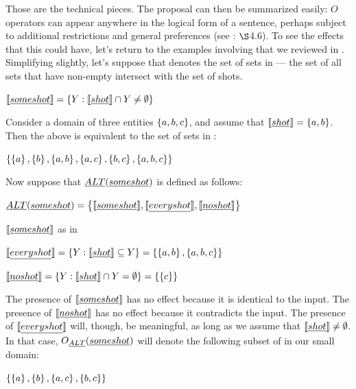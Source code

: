 \documentclass{article}
\begin{document}
Those are the technical pieces. The proposal can then be summarized
easily: $O$ operators can appear anywhere in the logical form of a
sentence, perhaps subject to additional restrictions and general
preferences (see \CFS: $\S$4.6). To see the effects that this could
have, let's return to the examples involving  that we
reviewed in . Simplifying slightly, let's
suppose that  denotes the set of sets in 
--- the set of all sets that have non-empty intersect with the set of
shots.
%
\begin{examples}
\item\label{someshot} $\llbracket\emph{some shot}\rrbracket = \left\{ Y : \llbracket\emph{shot}\rrbracket \cap Y \neq \emptyset \right\}$
\end{examples}
%
Consider a domain of three entities $\left\{ a,b,c \right\}$, and assume that
$\llbracket\emph{shot}\rrbracket = \left\{ a,b \right\}$. Then the above is equivalent to the
set of sets in :
%
\begin{examples}
\item\label{someshotex}
  $\left\{ \left\{ a \right\}, \left\{ b \right\}, \left\{ a,b \right\}, \left\{ a,c \right\}, \left\{ b,c \right\}, \left\{ a,b,c \right\} \right\}$
\end{examples}
%
Now suppose that $\emph{ALT}(\emph{some shot})$ is defined as follows:
%
\begin{examples}
\item\label{altsome} $\emph{ALT}(\emph{some shot}) =  
  \left\{ 
    \llbracket\emph{some shot}\rrbracket, 
    \llbracket\emph{every shot}\rrbracket, 
    \llbracket\emph{no shot}\rrbracket
   \right\}$
  \begin{examples}
  \item $\llbracket\emph{some shot}\rrbracket$ as in 
  \item $\llbracket\emph{every shot}\rrbracket = \left\{ Y : \llbracket\emph{shot}\rrbracket \subseteq Y \right\} = \left\{ \left\{ a,b \right\}, \left\{ a,b,c \right\} \right\}$
  \item $\llbracket\emph{no shot}\rrbracket = \left\{ Y : \llbracket\emph{shot}\rrbracket \cap Y = \emptyset \right\} = \left\{ \left\{ c \right\} \right\}$      
  \end{examples}
\end{examples}
%
The presence of $\llbracket\emph{some shot}\rrbracket$ has no effect because it is
identical to the input. The presence of $\llbracket\emph{no shot}\rrbracket$ has no
effect because it contradicts the input. The presence of
$\llbracket\emph{every shot}\rrbracket$ will, though, be meaningful, as long as we
assume that $\llbracket\emph{shot}\rrbracket \neq \emptyset$.  In that case,
$O_{\emph{ALT}}(\emph{some shot})$ will denote the following subset of 
 in our small domain:
%
\begin{examples}
\item\label{altsomeshotex}
  $\left\{ \left\{ a \right\}, \left\{ b \right\}, \left\{ a,c \right\}, \left\{ b,c \right\} \right\}$
\end{examples}
\end{document}
